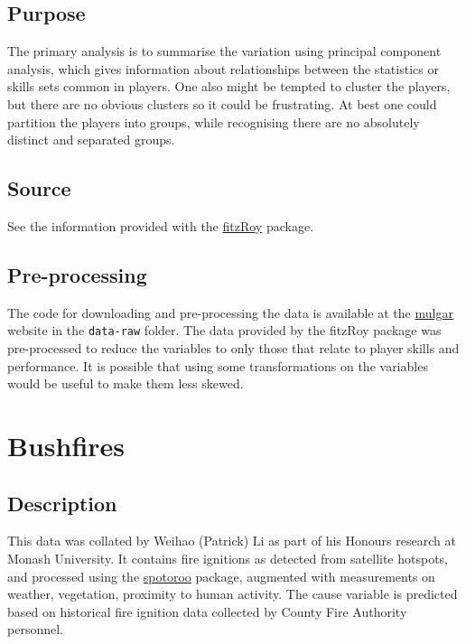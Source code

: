 \documentclass[
  letterpaper,
]{book}
\begin{document}
\hypertarget{purpose}{%
\subsection*{Purpose}\label{purpose}}

The primary analysis is to summarise the variation using principal
component analysis, which gives information about relationships between
the statistics or skills sets common in players. One also might be
tempted to cluster the players, but there are no obvious clusters so it
could be frustrating. At best one could partition the players into
groups, while recognising there are no absolutely distinct and separated
groups.

\hypertarget{source}{%
\subsection*{Source}\label{source}}

See the information provided with the
\href{https://jimmyday12.github.io/fitzRoy/}{fitzRoy} package.

\hypertarget{pre-processing}{%
\subsection*{Pre-processing}\label{pre-processing}}

The code for downloading and pre-processing the data is available at the
\href{https://dicook.github.io/mulgar/}{mulgar} website in the
\texttt{data-raw} folder. The data provided by the fitzRoy package was
pre-processed to reduce the variables to only those that relate to
player skills and performance. It is possible that using some
transformations on the variables would be useful to make them less
skewed.

\hypertarget{bushfires}{%
\section{Bushfires}\label{bushfires}}

\hypertarget{description-1}{%
\subsection*{Description}\label{description-1}}

This data was collated by Weihao (Patrick) Li as part of his Honours
research at Monash University. It contains fire ignitions as detected
from satellite hotspots, and processed using the
\href{https://tengmcing.github.io/spotoroo/}{spotoroo} package,
augmented with measurements on weather, vegetation, proximity to human
activity. The cause variable is predicted based on historical fire
ignition data collected by County Fire Authority personnel.
\end{document}
